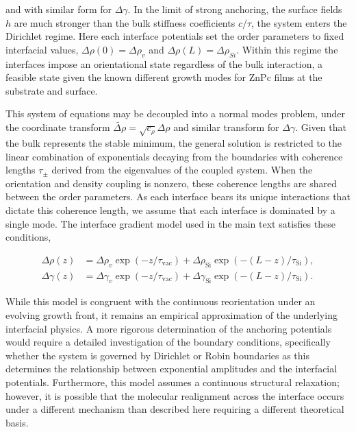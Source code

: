 and with similar form for \(\Delta\gamma\). In the limit of strong anchoring, the surface fields \(h\) are much stronger than the bulk stiffness coefficients \(c/\tau\), the system enters the Dirichlet regime. Here each interface potentials set the order parameters to fixed interfacial values, \(\Delta\rho(0) = {\Delta\rho}_{v}\) and \(\Delta\rho(L) = {\Delta\rho}_{Si}\). Within this regime the interfaces impose an orientational state regardless of the bulk interaction, a feasible state given the known different growth modes for ZnPc films at the substrate and surface.\autocite{derrienInterfacialRearrangementsStrain2022,yangMolecularOrientationInducedRapidRoughening2015}

This system of equations may be decoupled into a normal modes problem, under the coordinate transform \(\widetilde{\Delta\rho} = \sqrt{c_{\rho}}\Delta\rho\) and similar transform for \(\Delta\gamma\). Given that the bulk represents the stable minimum, the general solution is restricted to the linear combination of exponentials decaying from the boundaries with coherence lengths \(\tau_{\pm}\) derived from the eigenvalues of the coupled system. When the orientation and density coupling is nonzero, these coherence lengths are shared between the order parameters. As each interface bears its unique interactions that dictate this coherence length, we assume that each interface is dominated by a single mode. The interface gradient model used in the main text satisfies these conditions,

\begin{align}
  \Delta\rho(z) &= \Delta\rho_{v}\exp\left( - z/\tau_{\mathrm{vac}} \right) + \Delta\rho_{\mathrm{Si}}\exp\left( - (L - z)/\tau_{\mathrm{Si}} \right), \label{eq:S-profile-rho}\\
  \Delta\gamma(z) &= \Delta\gamma_{v}\exp\left( - z/\tau_{\mathrm{vac}} \right) + \Delta\gamma_{\mathrm{Si}}\exp\left( - (L - z)/\tau_{\mathrm{Si}} \right). \label{eq:S-profile-gamma}
\end{align}

While this model is congruent with the continuous reorientation under an evolving growth front, it remains an empirical approximation of the underlying interfacial physics. A more rigorous determination of the anchoring potentials would require a detailed investigation of the boundary conditions, specifically whether the system is governed by Dirichlet or Robin boundaries as this determines the relationship between exponential amplitudes and the interfacial potentials. Furthermore, this model assumes a continuous structural relaxation; however, it is possible that the molecular realignment across the interface occurs under a different mechanism than described here requiring a different theoretical basis.

